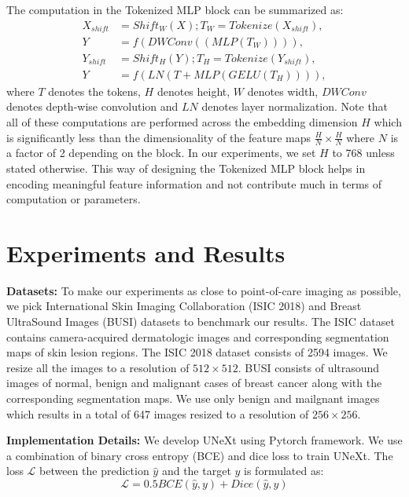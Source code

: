 \documentclass[runningheads]{llncs}
\begin{document}
The computation in the Tokenized MLP block can be summarized as:
\begin{align}
 X_{shift}  &= Shift_{W}(X); T_{W}  = Tokenize(X_{shift}),\\
 Y &= f(DWConv((MLP(T_{W})))),\\
  Y_{shift}  &= Shift_{H}(Y); T_{H}  = Tokenize(Y_{shift}),\\
  Y &= f(LN(T + MLP(GELU(T_{H})))),
    \end{align}
where $T$ denotes the tokens, $H$ denotes height, $W$ denotes width, $DWConv$ denotes depth-wise convolution and $LN$ denotes layer normalization. Note that all of these computations are performed across the embedding dimension $H$ which is significantly less than the dimensionality of the feature maps $\frac{H}{N} \times \frac{H}{N}$ where $N$ is a factor of 2 depending on the block. In our experiments, we set $H$ to 768 unless stated otherwise. This way of designing the Tokenized MLP block helps in encoding meaningful feature information and not contribute much in terms of computation or parameters. 

\section{Experiments and Results}

\noindent \textbf{Datasets:} To make our experiments as close to point-of-care imaging as possible, we pick International Skin Imaging Collaboration (ISIC 2018) \cite{codella2018skin} and Breast UltraSound Images (BUSI) \cite{al2020dataset} datasets to benchmark our results. The ISIC dataset  contains camera-acquired dermatologic images and corresponding segmentation maps of skin lesion regions. The ISIC 2018 dataset consists of 2594 images. We resize all the images to a resolution of $512 \times 512$. BUSI consists of ultrasound images of normal, benign and malignant cases of breast cancer along with the corresponding segmentation maps. We use only benign and mailgnant images which results in a total of 647 images resized to a resolution of $256 \times 256$. 

\noindent \textbf{Implementation Details:} We develop UNeXt using Pytorch framework. We use a combination of binary cross entropy (BCE) and dice loss to train UNeXt. The loss $\mathcal{L}$ between the prediction $\hat{y}$ and the target $y$ is formulated as:
\begin{equation}
    \mathcal{L} = 0.5  BCE(\hat{y}, y) + Dice(\hat{y}, y)
\end{equation}
\end{document}
